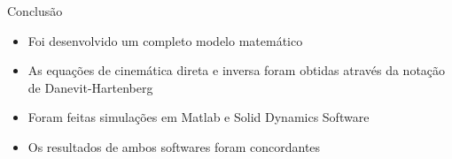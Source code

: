 \begin{frame}[c]{Conclusão} 
\Large
\begin{itemize}
    \item Foi desenvolvido um completo modelo matemático
    \item As equações de cinemática direta e inversa foram obtidas através da notação de Danevit-Hartenberg
    \item Foram feitas simulações em Matlab e Solid Dynamics Software
    \item Os resultados de ambos softwares foram concordantes
\end{itemize}
\end{frame}



